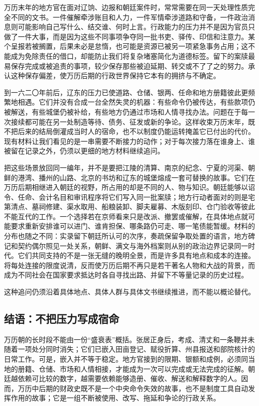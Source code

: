 万历末年的地方官在面对辽饷、边报和朝廷案件时，常常需要在同一天处理性质完全不同的文书。一件催解牵涉账目和人力，一件军情牵涉道路和守备，一件政治消息则可能影响自己写什么、结交谁、何时上言。行政能力的压力并不是因为官员只做了一件大事，而是因为这些不同事项争夺同一批书吏、驿传、印信和注意力。某个呈报若被搁置，后果未必是怠惰，也可能是资源已被另一项紧急事务占用；这不能成为免除责任的借口，却能防止我们将复杂堵塞简化为道德标签。留下的案牍最易保存完成或被追责的事项，较少保存那些被迫延期、转交或不了了之的努力。承认这种保存偏差，使万历后期的行政世界保持它本有的拥挤与不确定。

到一六二〇年前后，辽东的压力已使道路、仓储、银两、任命和地方册籍彼此更频繁地相遇。它们并没有合成一台全然失灵的机器：有些命令仍被传达，有些款项仍被解送，有些城堡仍被补给，有些地方仍通过市场和人情寻找办法。问题在于每一次接续都可能在另一处制造等待、债务、征发或新的争论。这样收束万历末年，既不把后来的结局倒灌成当时人的宿命，也不以制度仍能运转掩盖它已付出的代价。现有材料让我们看见的是一串需要不断接力的动作；对于每次接力落在谁身上、谁被留在记录之外，仍须以更细的地方材料继续追问。

把这些场景放回同一编年，并不是要把江陵的清算、南京的纪念、宁夏的河渠、朝鲜的港湾、播州的山路、北京的书坊和辽东的城堡熔成一套可替换的故事。它们在万历后期相继进入朝廷的视野，所占用的却是不同的人、物与知识。朝廷能够以诏令、任命、会计名目和审讯程序将它们写入同一批案牍；地方行动者面对的则是宅第清点、墓祠修建、渠水取用、船粮装卸、脚夫雇募、木版刻印、仓门验收等彼此不能互代的工作。一个选择若在京师看来只是改派、撤罢或催解，在具体地点就可能要求重新安排谁可以进门、谁肯担保、哪条路仍可走、哪一笔债能暂缓。材料的分布也随之不同：实录留下朝廷所认可的次序，奏疏保留争取处置的语言，地方碑记和契约偶尔照见一处关系，朝鲜、满文与海外档案则从别的政治边界记录同一时代。它们共同支持的不是一张无缝的晚明全景，而是许多具有地点和成本的连接。将每处连接的限度说清，反而使万历后期不再只是若干著名人物和大战的背景，而成为不同社会在国家要求抵达时各自寻找出路、并留下不等量记录的历史过程。

这种追问仍须沿着具体地点、具体人群与具体文书继续推进，而不能以概论替代。
\subsection{结语：不把压力写成宿命}

万历朝的长时段不能由一份“盛衰表”概括。张居正身后，考成、清丈和一条鞭并未随着一项处分同时消失；它们已嵌入田亩登记、赋役折算、州县报送和部院核计的日常工作。可是，嵌入并不等于稳定。地方官接到的限期、银额和成例，必须同当地的册籍、仓储、市场和人情相接，才能成为一次可以完成或无法完成的征解。朝廷越依赖可比较的数字，越需要依赖能够造册、催收、解送和解释数字的人。因而，万历中后期的财政史既不是一个中央命令失效的故事，也不是制度工具自动发挥作用的故事；它是一组不断被使用、改写、拖延和争论的行政关系。

